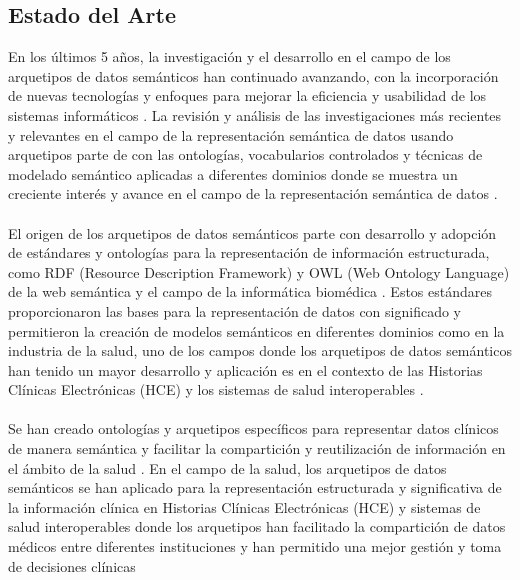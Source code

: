 \documentclass[12pt,a4paper]{article}
\begin{document}
\subsection{Estado del Arte}
\label{sec:7}
En los últimos 5 años, la investigación y el desarrollo en el campo de los arquetipos de datos semánticos han continuado avanzando, con la incorporación de nuevas tecnologías y enfoques para mejorar la eficiencia y usabilidad de los sistemas informáticos
\cite{Hassan2016}
\cite{Zhao2008}
\cite{Rasmussen2014}
. La revisión y análisis de las investigaciones más recientes y relevantes en el campo de la representación semántica de datos usando arquetipos parte de con las ontologías, vocabularios controlados y técnicas de modelado semántico aplicadas a diferentes dominios donde se muestra un creciente interés y avance en el campo de la representación semántica de datos
\cite{Kosti2016}
\cite{Sari2012}
\cite{Chuprina2017}
.
\\\\
El origen de los arquetipos de datos semánticos parte con desarrollo y adopción de estándares y ontologías para la representación de información estructurada, como RDF (Resource Description Framework) y OWL (Web Ontology Language) de la web semántica y el campo de la informática biomédica
\cite{Chuprina2017}
\cite{Chuprina2015}
\cite{Chuprina2016}
. Estos estándares proporcionaron las bases para la representación de datos con significado y permitieron la creación de modelos semánticos en diferentes dominios como en la industria de la salud, uno de los campos donde los arquetipos de datos semánticos han tenido un mayor desarrollo y aplicación es en el contexto de las Historias Clínicas Electrónicas (HCE) y los sistemas de salud interoperables
\cite{Marco-Ruiz2015a}
\cite{alonsobetanzos2016}
\cite{Upadhyay2023}
. 
\\\\
Se han creado ontologías y arquetipos específicos para representar datos clínicos de manera semántica y facilitar la compartición y reutilización de información en el ámbito de la salud
\cite{Upadhyay2023}
\cite{Zhao2008}
. En el campo de la salud, los arquetipos de datos semánticos se han aplicado para la representación estructurada y significativa de la información clínica en Historias Clínicas Electrónicas (HCE) y sistemas de salud interoperables donde los arquetipos han facilitado la compartición de datos médicos entre diferentes instituciones y han permitido una mejor gestión y toma de decisiones clínicas
\end{document}
